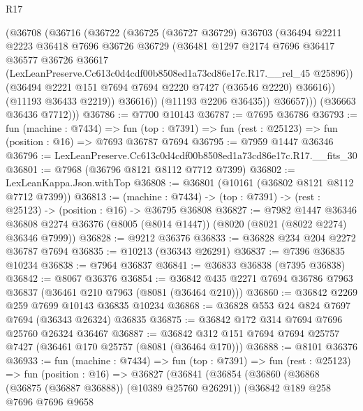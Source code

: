 \begin{lexlean}{R17}
\begin{coremodule}
              (@36708
                (@36716
                  (@36722
                    (@36725
                      (@36727 @36729)
                      @36703
                      (@36494
                        @2211
                        @2223
                        @36418
                        @7696
                        @36726
                        @36729
                        (@36481
                          @1297
                          @2174
                          @7696
                          @36417
                          @36577
                          @36726
                          @36617
                          (LexLeanPreserve.Cc613c0d4cdf00b8508ed1a73cd86e17c.R17.__rel_45 @25896))
                        (@36494 @2221 @151 @7694 @7694 @2220 @7427 (@36546 @2220) @36616))
                      (@11193 @36433 @2219))
                    @36616))
                (@11193 @2206 @36435))
              @36657)))
        (@36663 @36436 @7712)))
@36786 := @7700 @10143
@36787 := @7695 @36786
@36793 := fun (machine : @7434) =>
  fun (top : @7391) => fun (rest : @25123) => fun (position : @16) => @7693 @36787 @7694
@36795 := @7959 @1447 @36346
@36796 := LexLeanPreserve.Cc613c0d4cdf00b8508ed1a73cd86e17c.R17.__fits_30
@36801 := @7968 (@36796 @8121 @8112 @7712 @7399)
@36802 := LexLeanKappa.Json.withTop
@36808 := @36801 (@10161 (@36802 @8121 @8112 @7712 @7399))
@36813 := (machine : @7434) -> (top : @7391) -> (rest : @25123) -> (position : @16) -> @36795 @36808
@36827 := @7982
    @1447
    @36346
    @36808
    @2274
    @36376
    (@8005 (@8014 @1447))
    (@8020 (@8021 (@8022 @2274) @36346 @7999))
@36828 := @9212 @36376
@36833 := @36828 @234 @204 @2272 @36787 @7694
@36835 := @10213 (@36343 @26291)
@36837 := @7396 @36835 @10234
@36838 := @7964 @36837
@36841 := @36833 @36838 (@7395 @36838)
@36842 := @8067 @36376
@36854 := @36842 @435 @2271 @7694 @36786 @7963 @36837 (@36461 @210 @7963 (@8081 (@36464 @210)))
@36860 := @36842 @2269 @259 @7699 @10143 @36835 @10234
@36868 := @36828 @553 @24 @824 @7697 @7694 (@36343 @26324) @36835
@36875 := @36842 @172 @314 @7694 @7696 @25760 @26324 @36467
@36887 := @36842 @312 @151 @7694 @7694 @25757 @7427 (@36461 @170 @25757 (@8081 (@36464 @170)))
@36888 := @8101 @36376
@36933 := fun (machine : @7434) =>
  fun (top : @7391) =>
  fun (rest : @25123) =>
  fun (position : @16) =>
  @36827
    (@36841
      (@36854
        (@36860
          (@36868 (@36875 (@36887 @36888)) (@10389 @25760 @26291))
          (@36842
            @189
            @258
            @7696
            @7696
            @9658

\end{coremodule}
\end{lexlean}
